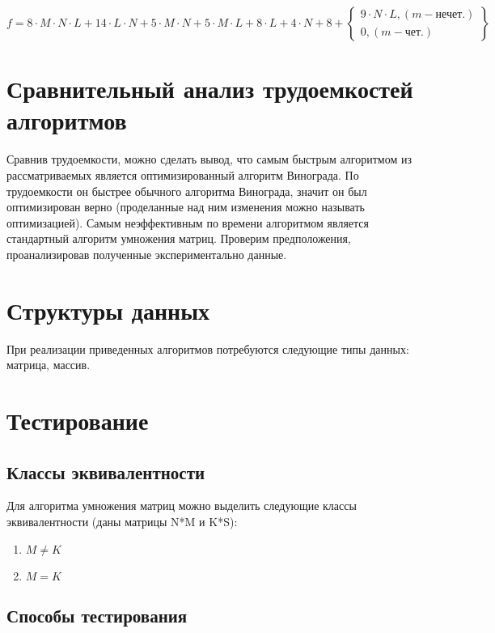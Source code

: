 $
f = 8 \cdot M \cdot N \cdot L + 14\cdot L \cdot N + 5\cdot M \cdot N + 5\cdot M \cdot L + 8 \cdot L + 4 \cdot N + 8 +
\left\{
    \begin{array}{ccc}
        9\cdot N\cdot L, (m-\text{нечет.})\\
        0, (m-\text{чет.}) 
    \end{array}
\right\}
$ \label{formula:smallresoptalgvinograd}

\section{Сравнительный анализ трудоемкостей алгоритмов}\label{Konstructanalis}

Сравнив трудоемкости, можно сделать вывод, что самым быстрым алгоритмом из рассматриваемых является оптимизированный алгоритм Винограда. 
По трудоемкости он быстрее обычного алгоритма Винограда, значит он был оптимизирован верно (проделанные над ним изменения можно называть оптимизацией). Самым неэффективным по времени
алгоритмом является стандартный алгоритм умножения матриц. Проверим предположения, проанализировав полученные экспериментально данные.

\section{Структуры данных}\label{Structs}

При реализации приведенных алгоритмов потребуются следующие типы данных: матрица, массив.

\section{Тестирование}\label{Testing}

\subsection{Классы эквивалентности}\label{TestingClasses}

Для алгоритма умножения матриц можно выделить следующие классы эквивалентности (даны матрицы N*M и K*S):

\begin{enumerate}
    \item $M \neq K $
    \item $M = K $
\end{enumerate}

\subsection{Способы тестирования}\label{TestingMethods}

